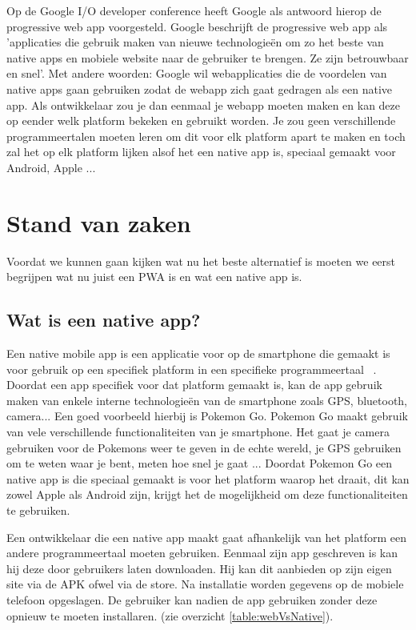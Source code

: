 Op de Google I/O developer conference heeft Google als antwoord hierop de progressive web app voorgesteld. Google beschrijft de progressive web app als 'applicaties die gebruik maken van nieuwe technologieën om zo het beste van native apps en mobiele website naar de gebruiker te brengen. Ze zijn betrouwbaar en snel'.
Met andere woorden: Google wil webapplicaties die de voordelen van native apps gaan gebruiken zodat de webapp zich gaat gedragen als een native app. 
Als ontwikkelaar zou je dan eenmaal je webapp moeten maken en kan deze op eender welk platform bekeken en gebruikt worden. Je zou geen verschillende programmeertalen moeten leren om dit voor elk platform apart te maken en toch zal het op elk platform lijken alsof het een native app is, speciaal gemaakt voor Android, Apple ...






\section{Stand van zaken}
\label{sec:stand-van-zaken}

Voordat we kunnen gaan kijken wat nu het beste alternatief is moeten we eerst begrijpen wat nu juist een PWA is en wat een native app is.

\subsection{Wat is een native app?}
Een native mobile app is een applicatie voor op de smartphone die gemaakt is voor gebruik op een specifiek platform in een specifieke programmeertaal ~\autocite{mobileWat}. Doordat een app specifiek voor dat platform gemaakt is, kan de app gebruik maken van enkele interne technologieën van de smartphone zoals GPS, bluetooth, camera... Een goed voorbeeld hierbij is Pokemon Go. Pokemon Go maakt gebruik van vele verschillende functionaliteiten van je smartphone. Het gaat je camera gebruiken voor de Pokemons weer te geven in de echte wereld, je GPS gebruiken om te weten waar je bent, meten hoe snel je gaat ...  Doordat Pokemon Go een native app is die speciaal gemaakt is voor het platform waarop het draait, dit kan zowel Apple als Android zijn, krijgt het de mogelijkheid om deze functionaliteiten te gebruiken. 

Een ontwikkelaar die een native app maakt gaat afhankelijk van het platform een andere programmeertaal moeten gebruiken. Eenmaal zijn app geschreven is kan hij deze door gebruikers laten downloaden. Hij kan dit aanbieden op zijn eigen site via de APK ofwel via de store. Na installatie worden gegevens op de mobiele telefoon opgeslagen. De gebruiker kan nadien de app gebruiken zonder deze opnieuw te moeten installaren. (zie overzicht \ref{table:webVsNative}).



